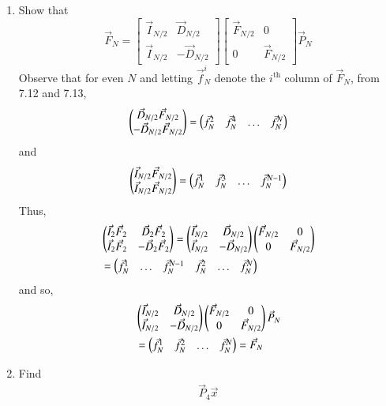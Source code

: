\documentclass[journal,12pt,twocolumn]{IEEEtran}
\renewcommand\thesection{\arabic{section}}
\begin{document}
\begin{enumerate}[label=\thesection.\arabic*
	,ref=\thesection.\theenumi]
\begin{enumerate}[label=\arabic*.,ref=\thesection.\theenumi]
\item Show that 
\begin{equation}
	\vec{F}_{N}=
	\begin{bmatrix}
		\vec{I}_{N/2} & \vec{D}_{N/2} \\
		\vec{I}_{N/2} & -\vec{D}_{N/2}
	\end{bmatrix}
	\begin{bmatrix}
		\vec{F}_{N/2} & 0 \\
		0 & \vec{F}_{N/2}
	\end{bmatrix}
	\vec{P}_{N}
\end{equation}
\solution Observe that for even $N$ and letting $\vec{f}_N^i$ denote the $i^{\text{th}}$ column of $\vec{F}_N$, from 7.12 and 7.13,
\begin{align}
	\begin{pmatrix}\vec{D}_{N/2}\vec{F}_{N/2} \\ -\vec{D}_{N/2}\vec{F}_{N/2}\end{pmatrix} = \begin{pmatrix}\vec{f}_N^{2} & \vec{f}_N^{4} & \ldots & \vec{f}_N^{N}\end{pmatrix}
\end{align}
and
\begin{align}
	\begin{pmatrix}\vec{I}_{N/2}\vec{F}_{N/2} \\ \vec{I}_{N/2}\vec{F}_{N/2}\end{pmatrix} = \begin{pmatrix}\vec{f}_N^{1} & \vec{f}_N^{3} & \ldots & \vec{f}_N^{N - 1}\end{pmatrix}
\end{align}
Thus,
\begin{align}
	&\begin{pmatrix}\vec{I}_2\vec{F}_2 & \vec{D}_2\vec{F}_2 \\ \vec{I}_2\vec{F}_2 & -\vec{D}_2\vec{F}_2\end{pmatrix} = \begin{pmatrix}\vec{I}_{N/2} & \vec{D}_{N/2} \\ \vec{I}_{N/2} & -\vec{D}_{N/2}\end{pmatrix}\begin{pmatrix}\vec{F}_{N/2} & 0 \\ 0 & \vec{F}_{N/2}\end{pmatrix} \nonumber \\
	&= \begin{pmatrix}\vec{f}_N^{1} & \ldots & \vec{f}_N^{N - 1} & \vec{f}_N^{2} & \ldots & \vec{f}_N^{N}\end{pmatrix}
\end{align}
and so,
\begin{align}
	&\begin{pmatrix}\vec{I}_{N/2} & \vec{D}_{N/2} \\ \vec{I}_{N/2} & -\vec{D}_{N/2}\end{pmatrix}\begin{pmatrix}\vec{F}_{N/2} & 0 \\ 0 & \vec{F}_{N/2}\end{pmatrix}\vec{P}_{N} \nonumber \\
	&= \begin{pmatrix}\vec{f}_N^{1} & \vec{f}_N^{2} & \ldots & \vec{f}_N^{N}\end{pmatrix} = \vec{F}_N
\end{align}
	\item Find 
	\begin{align}
		\vec{P}_4 \vec{x}
	\end{align}
	\solution
	\begin{equation}

\end{equation}
\end{enumerate}
\end{enumerate}
\end{document}
